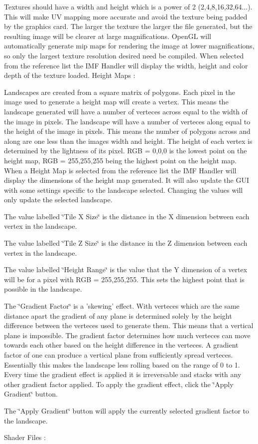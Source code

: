 Textures should have a width and height which is a power of 2 (2,4,8,16,32,64...). This will make UV mapping more accurate and avoid the texture being padded by the graphics card. The larger the texture the larger the file generated, but the resulting image will be clearer at large magnifications. OpenGL will automatically generate mip maps for rendering the image at lower magnifications, so only the largest texture resolution desired need be compiled. When selected from the reference list the IMF Handler will display the width, height and color depth of the texture loaded. Height Maps : \par
 Landscapes are created from a square matrix of polygons. Each pixel in the image used to generate a height map will create a vertex. This means the landscape generated will have a number of verteces across equal to the width of the image in pixels. The landscape will have a number of verteces along equal to the height of the image in pixels. This means the number of polygons across and along are one less than the images width and height. The height of each vertex is determined by the lightness of its pixel. RGB = 0,0,0 is the lowest point on the height map, RGB = 255,255,255 being the highest point on the height map. When a Height Map is selected from the reference list the IMF Handler will display the dimensions of the height map generated. It will also update the GUI with some settings specific to the landscape selected. Changing the values will only update the selected landscape.
\begin{DoxyItemize}
\item The value labelled \char`\"{}Tile X Size\char`\"{} is the distance in the X dimension between each vertex in the landscape.
\item The value labelled \char`\"{}Tile Z Size\char`\"{} is the distance in the Z dimension between each vertex in the landscape.
\item The value labelled \char`\"{}Height Range\char`\"{} is the value that the Y dimension of a vertex will be for a pixel with RGB = 255,255,255. This sets the highest point that is possible in the landscape.
\item The \char`\"{}Gradient Factor\char`\"{} is a 'skewing' effect. With verteces which are the same distance apart the gradient of any plane is determined solely by the height difference between the verteces used to generate them. This means that a vertical plane is impossible. The gradient factor determines how much verteces can move towards each other based on the height difference in the verteces. A gradient factor of one can produce a vertical plane from sufficiently spread verteces. Essentially this makes the landscape less rolling based on the range of 0 to 1. Every time the gradient effect is applied it is irreversable and stacks with any other gradient factor applied. To apply the gradient effect, click the \char`\"{}Apply Gradient\char`\"{} button.
\item The \char`\"{}Apply Gradient\char`\"{} button will apply the currently selected gradient factor to the landscape.
\end{DoxyItemize}Shader Files : \par
